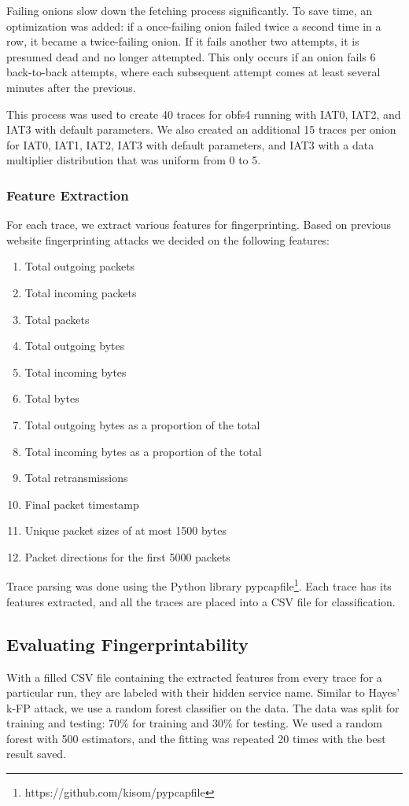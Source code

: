 \documentclass[11pt]{article}
\begin{document}
Failing onions slow down the fetching process significantly. To save time, an optimization was added: if a once-failing onion failed twice a second time in a row, it became a twice-failing onion. If it fails another two attempts, it is presumed dead and no longer attempted. This only occurs if an onion fails 6 back-to-back attempts, where each subsequent attempt comes at least several minutes after the previous.

This process was used to create 40 traces for obfs4 running with IAT0, IAT2, and IAT3 with default parameters. We also created an additional 15 traces per onion for IAT0, IAT1, IAT2, IAT3 with default parameters, and IAT3 with a data multiplier distribution that was uniform from 0 to 5.

\subsubsection{Feature Extraction}
For each trace, we extract various features for fingerprinting.
Based on previous website fingerprinting attacks we decided on the following features:
\begin{enumerate}
    \item Total outgoing packets
    \item Total incoming packets
    \item Total packets
    \item Total outgoing bytes
    \item Total incoming bytes
    \item Total bytes
    \item Total outgoing bytes as a proportion of the total
    \item Total incoming bytes as a proportion of the total
    \item Total retransmissions
    \item Final packet timestamp
    \item Unique packet sizes of at most 1500 bytes
    \item Packet directions for the first 5000 packets
\end{enumerate}
Trace parsing was done using the Python library pypcapfile\footnote{https://github.com/kisom/pypcapfile}. Each trace has its features extracted, and all the traces are placed into a CSV file for classification.

\subsection{Evaluating Fingerprintability}
With a filled CSV file containing the extracted features from every trace for a particular run, they are labeled with their hidden service name. Similar to Hayes' k-FP attack\cite{hayes}, we use a random forest classifier on the data. The data was split for training and testing: 70\% for training and 30\% for testing. We used a random forest with 500 estimators, and the fitting was repeated 20 times with the best result saved.
\end{document}
